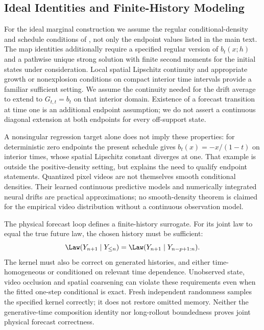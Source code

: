 \subsection{Ideal Identities and Finite-History Modeling}
\label{app:method-assumptions}
For the ideal marginal construction we assume the regular conditional-density and schedule conditions of \citet{chen2024forecasting}, not only the endpoint values listed in the main text. The map identities additionally require a specified regular version of $b_t(x;h)$ and a pathwise unique strong solution with finite second moments for the initial states under consideration. Local spatial Lipschitz continuity and appropriate growth or nonexplosion conditions on compact interior time intervals provide a familiar sufficient setting. We assume the continuity needed for the drift average to extend to $G_{t,t}=b_t$ on that interior domain. Existence of a forecast transition at time one is an additional endpoint assumption; we do not assert a continuous diagonal extension at both endpoints for every off-support state.

A nonsingular regression target alone does not imply these properties: for deterministic zero endpoints the present schedule gives $b_t(x)=-x/(1-t)$ on interior times, whose spatial Lipschitz constant diverges at one. That example is outside the positive-density setting, but explains the need to qualify endpoint statements. Quantized pixel videos are not themselves smooth conditional densities. Their learned continuous predictive models and numerically integrated neural drifts are practical approximations; no smooth-density theorem is claimed for the empirical video distribution without a continuous observation model.

The physical forecast loop defines a finite-history surrogate. For its joint law to equal the true future law, the chosen history must be sufficient:
\begin{equation}
\Law(Y_{n+1}\mid Y_{\le n})
=\Law(Y_{n+1}\mid Y_{n-p+1:n}).
\end{equation}
The kernel must also be correct on generated histories, and either time-homogeneous or conditioned on relevant time dependence. Unobserved state, video occlusion and spatial coarsening can violate these requirements even when the fitted one-step conditional is exact. Fresh independent randomness samples the specified kernel correctly; it does not restore omitted memory. Neither the generative-time composition identity nor long-rollout boundedness proves joint physical forecast correctness.

